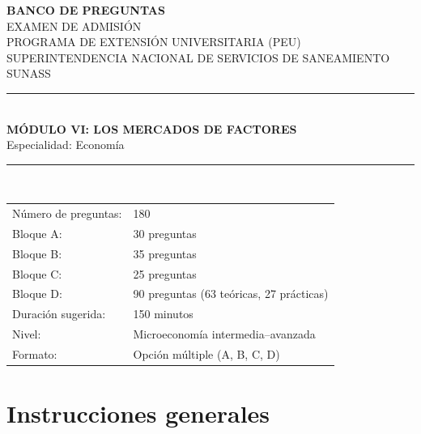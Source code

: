 \documentclass[11pt,a4paper]{article}
\begin{document}
\begin{titlepage}
\thispagestyle{empty}
\centering
\backboneportadaheader

{\Large\bfseries BANCO DE PREGUNTAS}\\[0.35cm]
{\large EXAMEN DE ADMISIÓN}\\[0.15cm]
{\large PROGRAMA DE EXTENSIÓN UNIVERSITARIA (PEU)}\\[0.15cm]
{\large SUPERINTENDENCIA NACIONAL DE SERVICIOS DE SANEAMIENTO}\\[0.05cm]
{\large SUNASS}\\[1.0cm]

\rule{\linewidth}{0.9pt}\\[0.55cm]
{\LARGE\bfseries MÓDULO VI: LOS MERCADOS DE FACTORES}\\[0.35cm]
{\large Especialidad: Economía}\\[0.55cm]
\rule{\linewidth}{0.9pt}\\[1.0cm]

\begin{tabular}{ll}
\toprule
Número de preguntas: & 180 \\
Bloque A: & 30 preguntas \\
Bloque B: & 35 preguntas \\
Bloque C: & 25 preguntas \\
Bloque D: & 90 preguntas (63 teóricas, 27 prácticas) \\
Duración sugerida: & 150 minutos \\
Nivel: & Microeconomía intermedia--avanzada \\
Formato: & Opción múltiple (A, B, C, D) \\
\bottomrule
\end{tabular}

\vfill
\backboneportadafooter
\end{titlepage}

\section*{Instrucciones generales}
\end{document}
